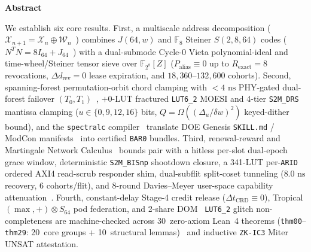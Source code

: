 \documentclass[10pt,twocolumn]{article}
\renewenvironment{abstract}{%
  \par\vspace{2pt}%
  \begin{center}%
  \begin{minipage}{0.95\textwidth}%
  \noindent{\color{black!55}\hrule height 0.4pt}\vspace{4pt}%
  \centerline{\bfseries\small Abstract}\vspace{3pt}%
  \fontsize{9.05}{11.15}\selectfont
  \setlength{\parskip}{0.38\baselineskip}%
  \setlength{\parindent}{0pt}%
}{%
  \par\vspace{4pt}\noindent{\color{black!55}\hrule height 0.4pt}%
  \end{minipage}%
  \end{center}%
  \vspace{3pt}%
}
\providecommand{\LeanTheoremTotal}{30}
\providecommand{\LeanCoreLoadBearing}{20}
\providecommand{\LeanStructuralLemmas}{10}
\providecommand{\ScrubShimLuts}{341}
\providecommand{\ScrubShimPhysicalLUTs}{\ScrubShimLuts}
\theoremstyle{spectralthm}
\begin{document}
\begin{abstract}
We establish six core results. First, a multiscale address decomposition ($\mathcal{X}_{n+1} = \mathcal{X}_n \oplus \mathcal{W}_n$~\cite{chen2001multilevel}) combines $J(64,w)$ and $\mathbb{F}_8$ Steiner $S(2,8,64)$ codes ($N^T N = 8I_{64}+J_{64}$~\cite{welch1974lower,kautz1964nonrandom}) with a dual-submode Cycle-0 Vieta polynomial-ideal and time-wheel/Steiner tensor sieve over $\mathbb{F}_{2^8}[Z]$ ($P_{\mathrm{alias}} \equiv 0$ up to $R_{\mathrm{exact}} = 8$ revocations, $\Delta d_{\mathrm{rev}} = 0$ lease expiration, and $18,360$--$132,600$ cohorts). Second, spanning-forest permutation-orbit chord clamping with $<4\text{~ns}$ PHY-gated dual-forest failover $(T_0,T_1)$~\cite{tutte1961problem,nashwilliams1961edge}, $+0$-LUT fractured \mbox{\texttt{LUT6\_2}} MOESI and 4-tier \texttt{S2M\_DRS} mantissa clamping ($u \in \{0,9,12,16\}$ bits, $Q = \Omega((\Delta_u/\delta w)^2)$ keyed-dither bound), and the \texttt{spectralc} compiler~\cite{mcconnell2011certifying} translate DOE Genesis \texttt{SKILL.md} / ModCon manifests~\cite{doe2025genesis} into certified \texttt{BAR0} bundles. Third, renewal-reward and Martingale Network Calculus~\cite{poloczek2014martingale} bounds pair with a hitless per-slot dual-epoch grace window, deterministic \texttt{S2M\_BISnp} shootdown closure, a \ScrubShimPhysicalLUTs-LUT per-\texttt{ARID} ordered AXI4 read-scrub responder shim, dual-subflit split-coset tunneling ($8.0\text{~ns}$ recovery, 6 cohorts/flit), and 8-round Davies--Meyer user-space capability attenuation~\cite{daemen1995cipher,birgisson2014macaroons}. Fourth, constant-delay Stage-4 credit release ($\Delta t_{\mathrm{CRD}} \equiv 0$), Tropical $(\max,+) \otimes S_{64}$ pod federation, and 2-share DOM~\cite{gross2016dom} \mbox{\texttt{LUT6\_2}} glitch non-completeness are machine-checked across \LeanTheoremTotal\ zero-axiom Lean~4 theorems (\texttt{thm00}--\texttt{thm29}: \LeanCoreLoadBearing\ core groups + \LeanStructuralLemmas\ structural lemmas)~\cite{demoura2021lean4} and inductive \texttt{ZK-IC3} Miter UNSAT attestation.


\end{abstract}
\end{document}
